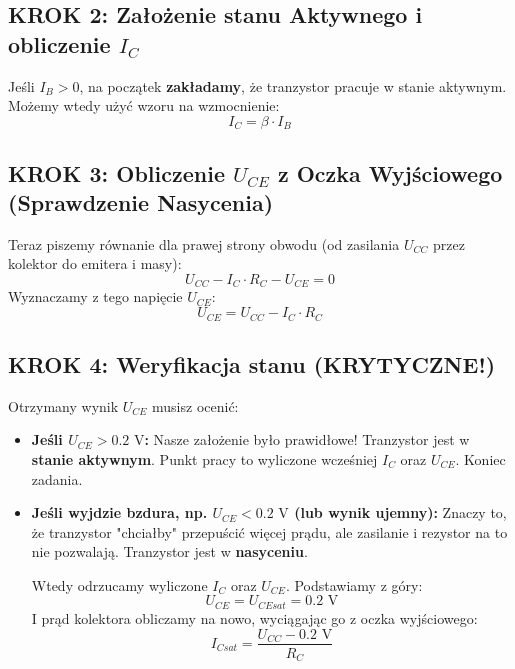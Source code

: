 \documentclass[11pt, a4paper]{article}
\begin{document}
\subsection*{KROK 2: Założenie stanu Aktywnego i obliczenie $I_C$}
Jeśli $I_B > 0$, na początek \textbf{zakładamy}, że tranzystor pracuje w stanie aktywnym. Możemy wtedy użyć wzoru na wzmocnienie:
\begin{equation}
    I_C = \beta \cdot I_B
\end{equation}

\subsection*{KROK 3: Obliczenie $U_{CE}$ z Oczka Wyjściowego (Sprawdzenie Nasycenia)}
Teraz piszemy równanie dla prawej strony obwodu (od zasilania $U_{CC}$ przez kolektor do emitera i masy):
\begin{equation}
    U_{CC} - I_C \cdot R_C - U_{CE} = 0
\end{equation}
Wyznaczamy z tego napięcie $U_{CE}$:
\begin{equation}
    U_{CE} = U_{CC} - I_C \cdot R_C
\end{equation}

\subsection*{KROK 4: Weryfikacja stanu (KRYTYCZNE!)}
Otrzymany wynik $U_{CE}$ musisz ocenić:
\begin{itemize}
    \item \textbf{Jeśli $U_{CE} > 0.2\text{ V}$:} Nasze założenie było prawidłowe! Tranzystor jest w \textbf{stanie aktywnym}. Punkt pracy to wyliczone wcześniej $I_C$ oraz $U_{CE}$. Koniec zadania.
    \item \textbf{Jeśli wyjdzie bzdura, np. $U_{CE} < 0.2\text{ V}$ (lub wynik ujemny):} Znaczy to, że tranzystor "chciałby" przepuścić więcej prądu, ale zasilanie i rezystor na to nie pozwalają. Tranzystor jest w \textbf{nasyceniu}.

          Wtedy odrzucamy wyliczone $I_C$ oraz $U_{CE}$. Podstawiamy z góry:
          \begin{equation}
              U_{CE} = U_{CEsat} = 0.2\text{ V}
          \end{equation}
          I prąd kolektora obliczamy na nowo, wyciągając go z oczka wyjściowego:
          \begin{equation}
              I_{Csat} = \frac{U_{CC} - 0.2\text{ V}}{R_C}
          \end{equation}
\end{itemize}
\end{document}
